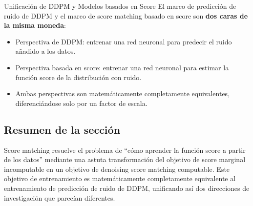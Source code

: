 \begin{importantbox}{Unificación de DDPM y Modelos basados en Score}
El marco de predicción de ruido de DDPM y el marco de score matching basado en score son \textbf{dos caras de la misma moneda}:
\begin{itemize}
    \item Perspectiva de DDPM: entrenar una red neuronal para predecir el ruido añadido a los datos.
    \item Perspectiva basada en score: entrenar una red neuronal para estimar la función score de la distribución con ruido.
    \item Ambas perspectivas son matemáticamente completamente equivalentes, diferenciándose solo por un factor de escala.
\end{itemize}
\end{importantbox}

\subsection{Resumen de la sección}

Score matching resuelve el problema de ``cómo aprender la función score a partir de los datos'' mediante una astuta transformación del objetivo de score marginal incomputable en un objetivo de denoising score matching computable. Este objetivo de entrenamiento es matemáticamente completamente equivalente al entrenamiento de predicción de ruido de DDPM, unificando así dos direcciones de investigación que parecían diferentes.
